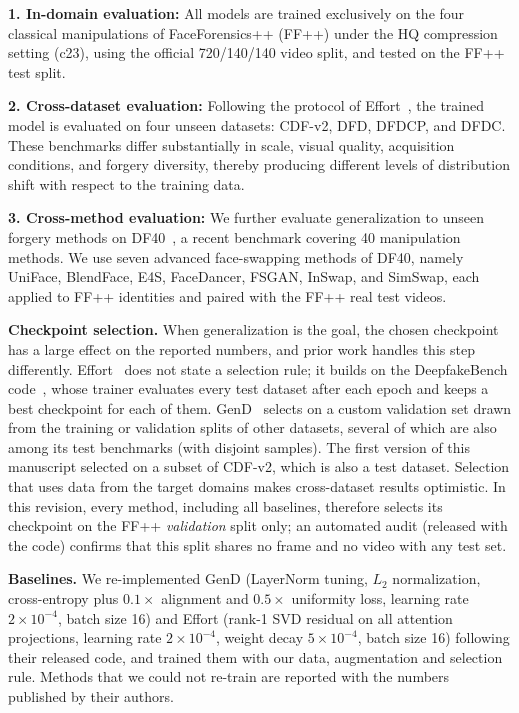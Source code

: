 \documentclass[fonts]{icst}
\begin{document}
\textbf{1. In-domain evaluation:}
All models are trained exclusively on the four classical manipulations of FaceForensics++ (FF++) under the HQ compression setting (c23), using the official 720/140/140 video split, and tested on the FF++ test split.

\textbf{2. Cross-dataset evaluation:}
Following the protocol of Effort~\cite{yan2025effort}, the trained model is evaluated on four unseen datasets: CDF-v2, DFD, DFDCP, and DFDC.
These benchmarks differ substantially in scale, visual quality, acquisition conditions, and forgery diversity, thereby producing different levels of distribution shift with respect to the training data.

\textbf{3. Cross-method evaluation:}
We further evaluate generalization to unseen forgery methods on DF40~\cite{yan2024df40}, a recent benchmark covering 40 manipulation methods.
We use seven advanced face-swapping methods of DF40, namely UniFace, BlendFace, E4S, FaceDancer, FSGAN, InSwap, and SimSwap, each applied to FF++ identities and paired with the FF++ real test videos.

\noindent\textbf{Checkpoint selection.}\label{sec:selection}
When generalization is the goal, the chosen checkpoint has a large effect on the reported numbers, and prior work handles this step differently. Effort~\cite{yan2025effort} does not state a selection rule; it builds on the DeepfakeBench code~\cite{yan2023deepfakebench}, whose trainer evaluates every test dataset after each epoch and keeps a best checkpoint for each of them. GenD~\cite{yermakov2025gend} selects on a custom validation set drawn from the training or validation splits of other datasets, several of which are also among its test benchmarks (with disjoint samples). The first version of this manuscript selected on a subset of CDF-v2, which is also a test dataset. Selection that uses data from the target domains makes cross-dataset results optimistic. In this revision, every method, including all baselines, therefore selects its checkpoint on the FF++ \emph{validation} split only; an automated audit (released with the code) confirms that this split shares no frame and no video with any test set.

\noindent\textbf{Baselines.}
We re-implemented GenD (LayerNorm tuning, $L_2$ normalization, cross-entropy plus $0.1\times$ alignment and $0.5\times$ uniformity loss, learning rate $2\times10^{-4}$, batch size 16) and Effort (rank-1 SVD residual on all attention projections, learning rate $2\times10^{-4}$, weight decay $5\times10^{-4}$, batch size 16) following their released code, and trained them with our data, augmentation and selection rule. Methods that we could not re-train are reported with the numbers published by their authors.
\end{document}
